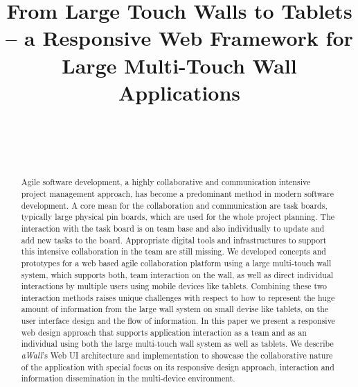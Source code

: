 \documentclass{sigchi}
\begin{document}
\title{From Large Touch Walls to Tablets -- a Responsive Web Framework for Large Multi-Touch Wall Applications}

\author{%
  \\
  \\
  \\
}

\maketitle



\begin{abstract}
Agile software development, a highly collaborative and communication intensive project management approach, has become a predominant method in modern software development. A core mean for the collaboration and communication are task boards, typically large physical pin boards, which are used for the whole project planning.  The interaction with the task board is on team base and also individually to update and add new tasks to the board. Appropriate digital tools and infrastructures to support this intensive collaboration in the team are still missing. 
We developed concepts and prototypes for a web based agile collaboration platform using a large multi-touch wall system, which supports both, team interaction on the wall, as well as direct individual interactions by multiple users using mobile devices like tablets. Combining these two interaction methods raises unique challenges with respect to how to represent the huge amount of information from the large wall system on small devise like tablets, on the user interface design and the flow of information.
In this paper we present a responsive web design approach that supports application interaction as a team and as an individual using both the large multi-touch wall system as well as tablets.  We describe \textit{aWall}'s Web UI architecture and implementation to showcase the collaborative nature of the application with special focus on its responsive design approach, interaction and information dissemination in the multi-device environment.
\end{abstract}
\end{document}
